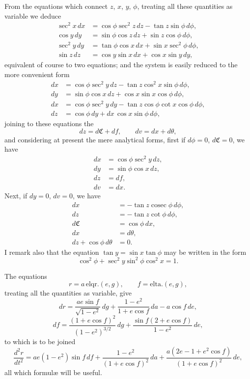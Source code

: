 \documentclass[11pt]{article}
\providecommand{\elqr}{\mathrm{elqr.}}
\providecommand{\elta}{\mathrm{elta.}}
\providecommand{\cosec}{\mathop{\mathrm{cosec}}}
\begin{document}
From the equations which connect $z$, $x$, $y$, $\phi$, treating all these quantities as variable we deduce
\begin{align*}
\sec^2 x\,dx &= \cos\phi \sec^2 z\,dz - \tan z \sin\phi\,d\phi,\\
\cos y\,dy &= \sin\phi \cos z\,dz + \sin z \cos\phi\,d\phi,\\
\sec^2 y\,dy &= \tan\phi \cos x\,dx + \sin x \sec^2\phi\,d\phi,\\
\sin z\,dz &= \cos y \sin x\,dx + \cos x \sin y\,dy,
\end{align*}
equivalent of course to two equations; and the system is easily reduced to the more convenient form
\begin{align*}
dx &= \cos\phi \sec^2 y\,dz - \tan z \cos^2 x \sin\phi\,d\phi,\\
dy &= \sin\phi \cos x\,dz + \cos x \sin x \cos\phi\,d\phi,\\
dx &= \cos\phi \sec^2 y\,dy - \tan z \cos\phi \cot x \cos\phi\,d\phi,\\
dz &= \cos\phi\,dy + dx\,\cos x \sin\phi\,d\phi,
\end{align*}
joining to these equations the
\[
dz = d\mathfrak{C} + df, \qquad dv = dx + d\theta,
\]
and considering at present the mere analytical forms, first if $d\phi = 0$, $d\mathfrak{C} = 0$, we have
\begin{align*}
dx &= \cos\phi \sec^2 y\,dz,\\
dy &= \sin\phi \cos x\,dz,\\
dz &= df,\\
dv &= dx.
\end{align*}
Next, if $dy = 0$, $dv = 0$, we have
\begin{align*}
dx &= -\tan z \cosec\phi\,d\phi,\\
dz &= -\tan z \cot\phi\,d\phi,\\
d\mathfrak{C} &= \cos\phi\,dx,\\
dx &= d\theta,\\
dz + \cos\phi\,d\theta &= 0.
\end{align*}
I remark also that the equation $\tan y = \sin x \tan\phi$ may be written in the form
\[
\cos^2\phi + \sec^2 y \sin^2\phi \cos^2 x = 1.
\]

\medskip

The equations
\[
r = a\,\elqr(e,g), \qquad f = \elta(e,g),
\]
treating all the quantities as variable, give
\[
dr = \frac{ae\sin f}{\sqrt{1-e^2}}\,dg + \frac{1-e^2}{1+e\cos f}\,da - a\cos f\,de,
\]
\[
df = \frac{(1+e\cos f)^2}{(1-e^2)^{3/2}}\,dg + \frac{\sin f(2+e\cos f)}{1-e^2}\,de,
\]
to which is to be joined
\[
\frac{d^2 r}{dt^2} = ae(1-e^2)\sin f\,df + \frac{1-e^2}{(1+e\cos f)^2}\,da + \frac{a(2e-1+e^2\cos f)}{(1+e\cos f)^2}\,de,
\]
all which formul{\ae} will be useful.
\end{document}
